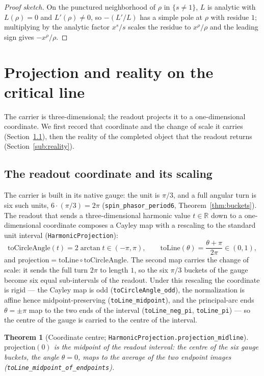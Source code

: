 \documentclass[11pt]{article}
\newtheorem{theorem}[definition]{Theorem}
\newcommand{\R}{\mathbb{R}}
\newcommand{\code}[1]{\texttt{#1}}
\begin{document}
\begin{proof}[Proof sketch]
On the punctured neighborhood of $\rho$ in $\{s\neq 1\}$, $L$ is analytic with $L(\rho)=0$ and
$L'(\rho)\neq0$, so $-(L'/L)$ has a simple pole at $\rho$ with residue $1$; multiplying by the
analytic factor $x^{s}/s$ scales the residue to $x^{\rho}/\rho$ and the leading sign gives
$-x^{\rho}/\rho$.
\end{proof}

\section{Projection and reality on the critical line}\label{sec:projection}

The carrier is three-dimensional; the readout projects it to a one-dimensional coordinate. We first
record that coordinate and the change of scale it carries
(Section~\ref{sub:readout}), then the reality of the completed object that the readout returns
(Section~\ref{sub:reality}).

\subsection{The readout coordinate and its scaling}\label{sub:readout}

The carrier is built in its native gauge: the unit is $\pi/3$, and a full angular turn is six such
units, $6\cdot(\pi/3)=2\pi$ (\code{spin\_phasor\_period6}, Theorem~\ref{thm:buckets}). The readout that
sends a three-dimensional harmonic value $t\in\R$ down to a one-dimensional coordinate composes a
Cayley map \cite{Ahlfors1979} with a rescaling to the standard unit interval (\code{HarmonicProjection}):
\[
  \mathrm{toCircleAngle}(t)=2\arctan t\in(-\pi,\pi),\qquad
  \mathrm{toLine}(\theta)=\frac{\theta+\pi}{2\pi}\in(0,1),
\]
and $\mathrm{projection}=\mathrm{toLine}\circ\mathrm{toCircleAngle}$. The second map carries the change
of scale: it sends the full turn $2\pi$ to length $1$, so the six $\pi/3$ buckets of the gauge become
six equal sub-intervals of the readout. Under this rescaling the coordinate is rigid --- the Cayley
map is odd (\code{toCircleAngle\_odd}), the normalization is affine hence midpoint-preserving
(\code{toLine\_midpoint}), and the principal-arc ends $\theta=\pm\pi$ map to the two ends of the
interval (\code{toLine\_neg\_pi}, \code{toLine\_pi}) --- so the centre of the gauge is carried to the
centre of the interval.

\begin{theorem}[Coordinate centre; \code{HarmonicProjection.projection\_midline}]\label{thm:midline}
$\mathrm{projection}(0)$ is the midpoint of the readout interval: the centre of the six gauge buckets,
the angle $\theta=0$, maps to the average of the two endpoint images
(\code{toLine\_midpoint\_of\_endpoints}).
\end{theorem}
\end{document}
